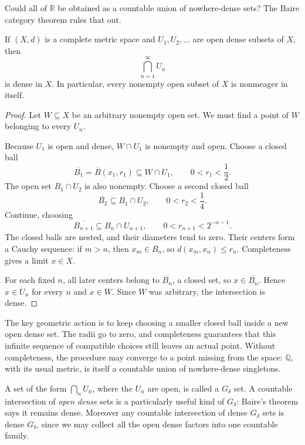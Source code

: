 Could all of \(\mathbb R\) be obtained as a countable union of nowhere-dense sets? The Baire category theorem rules that out.

\begin{theorem}
If \((X,d)\) is a complete metric space and \(U_1,U_2,\ldots\) are open dense subsets of \(X\), then
\[
 \bigcap_{n=1}^\infty U_n
\]
is dense in \(X\). In particular, every nonempty open subset of \(X\) is nonmeager in itself.
\end{theorem}

\begin{proof}
Let \(W\subseteq X\) be an arbitrary nonempty open set. We must find a point of \(W\) belonging to every \(U_n\).

Because \(U_1\) is open and dense, \(W\cap U_1\) is nonempty and open. Choose a closed ball
\[
 \overline{B_1}=\overline{B}(x_1,r_1)
 \subseteq W\cap U_1,\qquad 0<r_1<\frac12.
\]
The open set \(B_1\cap U_2\) is also nonempty. Choose a second closed ball
\[
 \overline{B_2}\subseteq B_1\cap U_2,\qquad0<r_2<\frac14.
\]
Continue, choosing
\[
 \overline{B_{n+1}}\subseteq B_n\cap U_{n+1},
 \qquad0<r_{n+1}<2^{-n-1}.
\]
The closed balls are nested, and their diameters tend to zero. Their centers form a Cauchy sequence: if \(m>n\), then \(x_m\in B_n\), so \(d(x_m,x_n)\le r_n\). Completeness gives a limit \(x\in X\).

For each fixed \(n\), all later centers belong to \(\overline{B_n}\), a closed set, so \(x\in\overline{B_n}\). Hence \(x\in U_n\) for every \(n\) and \(x\in W\). Since \(W\) was arbitrary, the intersection is dense.
\end{proof}

The key geometric action is to keep choosing a smaller closed ball inside a new open dense set. The radii go to zero, and completeness guarantees that this infinite sequence of compatible choices still leaves an actual point. Without completeness, the procedure may converge to a point missing from the space: \(\mathbb Q\), with its usual metric, is itself a countable union of nowhere-dense singletons.

A set of the form \(\bigcap_n U_n\), where the \(U_n\) are open, is called a \(G_\delta\) set. A countable intersection of \emph{open dense} sets is a particularly useful kind of \(G_\delta\): Baire's theorem says it remains dense. Moreover any countable intersection of dense \(G_\delta\) sets is dense \(G_\delta\), since we may collect all the open dense factors into one countable family.

